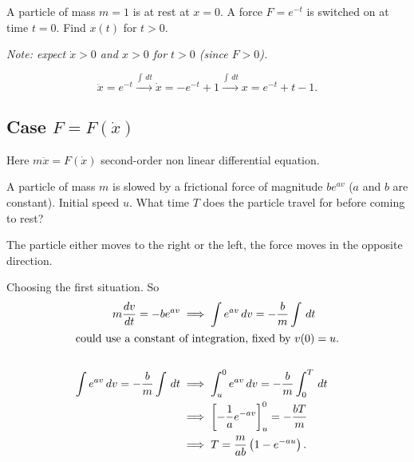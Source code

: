 \documentclass[10pt, a4paper]{article}
\begin{document}
\begin{example}
    A particle of mass $m = 1$ is at rest at $x = 0$.
    A force $F = e ^ {-t}$ is switched on at time $t = 0$.
    Find $x(t)$ for $t > 0$.

    \textit{Note:
    expect $\dot{x} > 0$ and $x > 0$ for $t > 0$
    (since $F > 0$).}

    \begin{solution}
        \[
        \ddot{x} = e ^ {-t} \xrightarrow{\int\,dt} \dot{x} = -e ^ {-t} + 1 \xrightarrow{\int\,dt} x = e ^ {-t} + t - 1.
        \]
    \end{solution}
\end{example}

\subsection{Case \texorpdfstring{$F = F(\dot{x})$}{}}

\begin{remark}
    Here $m\ddot{x} = F(\dot{x})$ second-order non linear differential equation.
\end{remark}

\begin{example}
    A particle of mass $m$ is slowed by a frictional force of magnitude $be ^ {av}$
    ($a$ and $b$ are constant).
    Initial speed $u$.
    What time $T$ does the particle travel for before coming to rest?
    
    \begin{solution}
        The particle either moves to the right or the left,
        the force moves in the opposite direction.

        Choosing the first situation.
        So
        \begin{align*}
            m\frac{dv}{dt} = -be ^ {av} &\implies \int e ^ {av}\,dv = -\frac{b}{m}\int\,dt \\
            \intertext{could use a constant of integration,
            fixed by $v(0) = u$.} \\
            \int e ^ {av}\,dv = -\frac{b}{m}\int\,dt &\implies \int_{u}^{0} e ^ {av}\,dv = -\frac{b}{m}\int_{0}^{T}\,dt \\
            &\implies \left[-\frac{1}{a}e ^ {-av}\right]_{u}^{0} = -\frac{bT}{m} \\
            &\implies T = \frac{m}{ab}\left(1 - e ^ {-au}\right).
        \end{align*}
    \end{solution}
\end{example}
\end{document}
